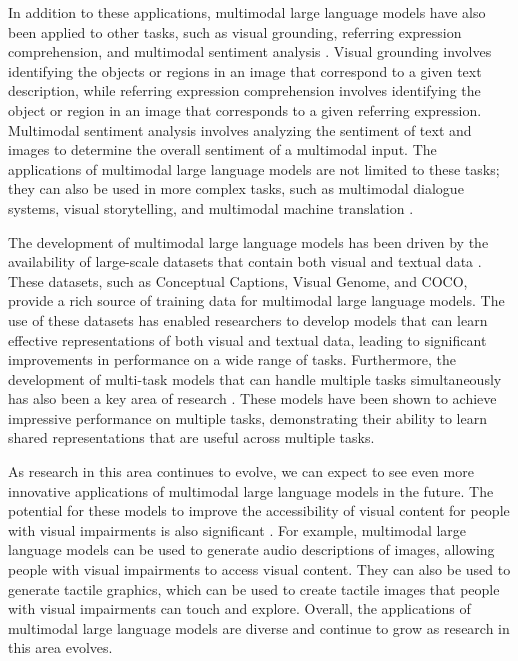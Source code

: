 \documentclass[11pt]{article}
\begin{document}
In addition to these applications, multimodal large language models have also been applied to other tasks, such as visual grounding, referring expression comprehension, and multimodal sentiment analysis \cite{ref290}. Visual grounding involves identifying the objects or regions in an image that correspond to a given text description, while referring expression comprehension involves identifying the object or region in an image that corresponds to a given referring expression. Multimodal sentiment analysis involves analyzing the sentiment of text and images to determine the overall sentiment of a multimodal input. The applications of multimodal large language models are not limited to these tasks; they can also be used in more complex tasks, such as multimodal dialogue systems, visual storytelling, and multimodal machine translation \cite{ref291}.

The development of multimodal large language models has been driven by the availability of large-scale datasets that contain both visual and textual data \cite{ref292}. These datasets, such as Conceptual Captions, Visual Genome, and COCO, provide a rich source of training data for multimodal large language models. The use of these datasets has enabled researchers to develop models that can learn effective representations of both visual and textual data, leading to significant improvements in performance on a wide range of tasks. Furthermore, the development of multi-task models that can handle multiple tasks simultaneously has also been a key area of research \cite{ref293}. These models have been shown to achieve impressive performance on multiple tasks, demonstrating their ability to learn shared representations that are useful across multiple tasks.

As research in this area continues to evolve, we can expect to see even more innovative applications of multimodal large language models in the future. The potential for these models to improve the accessibility of visual content for people with visual impairments is also significant \cite{ref294}. For example, multimodal large language models can be used to generate audio descriptions of images, allowing people with visual impairments to access visual content. They can also be used to generate tactile graphics, which can be used to create tactile images that people with visual impairments can touch and explore. Overall, the applications of multimodal large language models are diverse and continue to grow as research in this area evolves.
\end{document}
